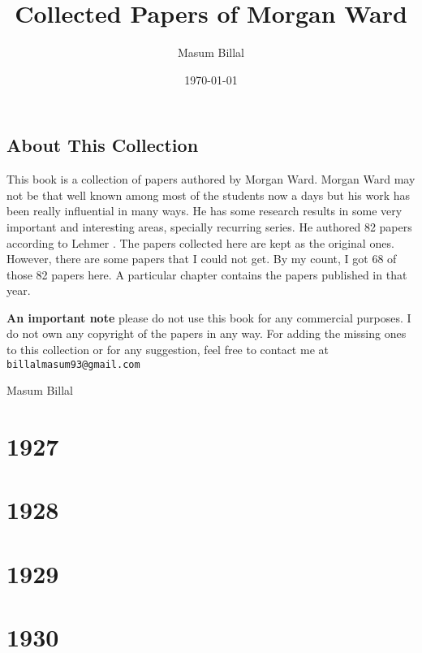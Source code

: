 \documentclass[a4paper, 12pt]{book}
\title{\bfseries Collected Papers of Morgan Ward}
\author{Masum Billal}
\begin{document}
	\maketitle
	\frontmatter
	\section*{About This Collection}
	This book is a collection of papers authored by Morgan Ward. Morgan Ward may not be that well known among most of the students now a days but his work has been really influential in many ways. He has some research results in some very important and interesting areas, specially recurring series. He authored 82 papers according to Lehmer \cite{lehmer}. The papers collected here are kept as the original ones. However, there are some papers that I could not get. By my count, I got 68 of those 82 papers here. A particular chapter contains the papers published in that year.
	
	\textbf{An important note }please do not use this book for any commercial purposes. I do not own any copyright of the papers in any way. For adding the missing ones to this collection or for any suggestion, feel free to contact me at \texttt{billalmasum93@gmail.com}
	\begin{flushright}
		Masum Billal\\
		\date{\today}
	\end{flushright}
	\tableofcontents
	\mainmatter
	\chapter{1927}
	
	
	\chapter{1928}
	
	
	\chapter{1929}
	
	
	\chapter{1930}
	
	
\end{document}
